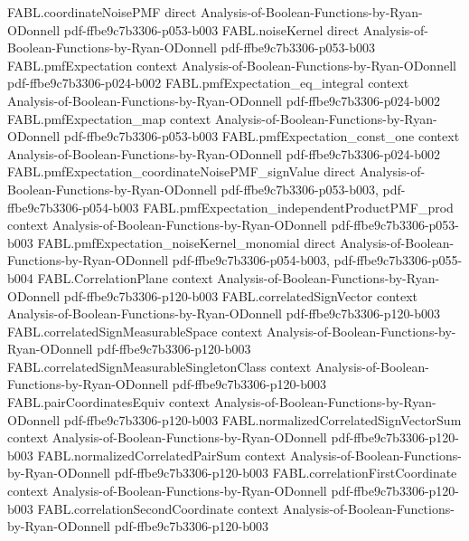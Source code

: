 \begin{theorem}
\proofstep
  {FABL.coordinateNoisePMF}
  {direct}
  {Analysis-of-Boolean-Functions-by-Ryan-ODonnell}
  {pdf-ffbe9c7b3306-p053-b003}
\proofstep
  {FABL.noiseKernel}
  {direct}
  {Analysis-of-Boolean-Functions-by-Ryan-ODonnell}
  {pdf-ffbe9c7b3306-p053-b003}
\proofstep
  {FABL.pmfExpectation}
  {context}
  {Analysis-of-Boolean-Functions-by-Ryan-ODonnell}
  {pdf-ffbe9c7b3306-p024-b002}
\proofstep
  {FABL.pmfExpectation_eq_integral}
  {context}
  {Analysis-of-Boolean-Functions-by-Ryan-ODonnell}
  {pdf-ffbe9c7b3306-p024-b002}
\proofstep
  {FABL.pmfExpectation_map}
  {context}
  {Analysis-of-Boolean-Functions-by-Ryan-ODonnell}
  {pdf-ffbe9c7b3306-p053-b003}
\proofstep
  {FABL.pmfExpectation_const_one}
  {context}
  {Analysis-of-Boolean-Functions-by-Ryan-ODonnell}
  {pdf-ffbe9c7b3306-p024-b002}
\proofstep
  {FABL.pmfExpectation_coordinateNoisePMF_signValue}
  {direct}
  {Analysis-of-Boolean-Functions-by-Ryan-ODonnell}
  {pdf-ffbe9c7b3306-p053-b003,
    pdf-ffbe9c7b3306-p054-b003}
\proofstep
  {FABL.pmfExpectation_independentProductPMF_prod}
  {context}
  {Analysis-of-Boolean-Functions-by-Ryan-ODonnell}
  {pdf-ffbe9c7b3306-p053-b003}
\proofstep
  {FABL.pmfExpectation_noiseKernel_monomial}
  {direct}
  {Analysis-of-Boolean-Functions-by-Ryan-ODonnell}
  {pdf-ffbe9c7b3306-p054-b003,
    pdf-ffbe9c7b3306-p055-b004}
\proofstep
  {FABL.CorrelationPlane}
  {context}
  {Analysis-of-Boolean-Functions-by-Ryan-ODonnell}
  {pdf-ffbe9c7b3306-p120-b003}
\proofstep
  {FABL.correlatedSignVector}
  {context}
  {Analysis-of-Boolean-Functions-by-Ryan-ODonnell}
  {pdf-ffbe9c7b3306-p120-b003}
\proofstep
  {FABL.correlatedSignMeasurableSpace}
  {context}
  {Analysis-of-Boolean-Functions-by-Ryan-ODonnell}
  {pdf-ffbe9c7b3306-p120-b003}
\proofstep
  {FABL.correlatedSignMeasurableSingletonClass}
  {context}
  {Analysis-of-Boolean-Functions-by-Ryan-ODonnell}
  {pdf-ffbe9c7b3306-p120-b003}
\proofstep
  {FABL.pairCoordinatesEquiv}
  {context}
  {Analysis-of-Boolean-Functions-by-Ryan-ODonnell}
  {pdf-ffbe9c7b3306-p120-b003}
\proofstep
  {FABL.normalizedCorrelatedSignVectorSum}
  {context}
  {Analysis-of-Boolean-Functions-by-Ryan-ODonnell}
  {pdf-ffbe9c7b3306-p120-b003}
\proofstep
  {FABL.normalizedCorrelatedPairSum}
  {context}
  {Analysis-of-Boolean-Functions-by-Ryan-ODonnell}
  {pdf-ffbe9c7b3306-p120-b003}
\proofstep
  {FABL.correlationFirstCoordinate}
  {context}
  {Analysis-of-Boolean-Functions-by-Ryan-ODonnell}
  {pdf-ffbe9c7b3306-p120-b003}
\proofstep
  {FABL.correlationSecondCoordinate}
  {context}
  {Analysis-of-Boolean-Functions-by-Ryan-ODonnell}
  {pdf-ffbe9c7b3306-p120-b003}
\proofstep

\end{theorem}
